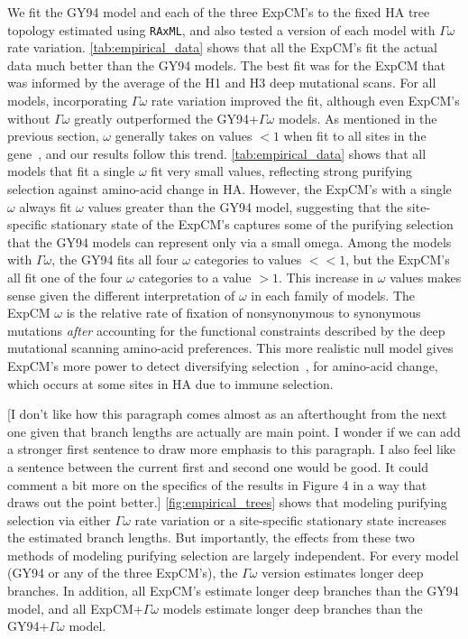 \documentclass[11pt]{article}
\newcommand\skhcomment[1]{{\color{cyan}[#1]}}
\begin{document}
We fit the GY94 model and each of the three ExpCM's to the fixed HA tree topology estimated using \texttt{RAxML}, and also tested a version of each model with $\Gamma\omega$ rate variation.
\ref{tab:empirical_data} shows that all the ExpCM's fit the actual data much better than the GY94 models.
The best fit was for the ExpCM that was informed by the average of the H1 and H3 deep mutational scans.
For all models, incorporating $\Gamma\omega$ rate variation improved the fit, although even ExpCM's without $\Gamma\omega$ greatly outperformed the GY94+$\Gamma\omega$ models.
As mentioned in the previous section, $\omega$ generally takes on values $<1$ when fit to all sites in the gene~\citep{murrell2015gene}, and our results follow this trend. 
\ref{tab:empirical_data} shows that all models that fit a single $\omega$ fit very small values, reflecting strong purifying selection against amino-acid change in HA. 
However, the ExpCM's with a single $\omega$ always fit $\omega$ values greater than the GY94 model, suggesting that the site-specific stationary state of the ExpCM's captures some of the purifying selection that the GY94 models can represent only via a small omega.
Among the models with $\Gamma\omega$, the GY94 fits all four $\omega$ categories to values $<< 1$, but the ExpCM's all fit one of the four $\omega$ categories to a value $>1$.
This increase in $\omega$ values makes sense given the different interpretation of $\omega$ in each family of models. 
The ExpCM $\omega$ is the relative rate of fixation of nonsynonymous to synonymous mutations \textit{after} accounting for the functional constraints described by the deep mutational scanning amino-acid preferences.
This more realistic null model gives ExpCM's more power to detect diversifying selection~\citep{bloom2017identification, odrigue2016detecting}, for amino-acid change, which occurs at some sites in HA due to immune selection.

\skhcomment{I don't like how this paragraph comes almost as an afterthought from the next one given that branch lengths are actually are main point. I wonder if we can add a stronger first sentence to draw more emphasis to this paragraph. I also feel like a sentence between the current first and second one would be good. It could comment a bit more on the specifics of the results in Figure 4 in a way that draws out the point better.}
\ref{fig:empirical_trees} shows that modeling purifying selection via either $\Gamma\omega$ rate variation or a site-specific stationary state increases the estimated branch lengths.
But importantly, the effects from these two methods of modeling purifying selection are largely independent.
For every model (GY94 or any of the three ExpCM's), the $\Gamma\omega$ version estimates longer deep branches.
In addition, all ExpCM's estimate longer deep branches than the GY94 model, and all ExpCM+$\Gamma\omega$ models estimate longer deep branches than the GY94+$\Gamma\omega$ model.
\end{document}
